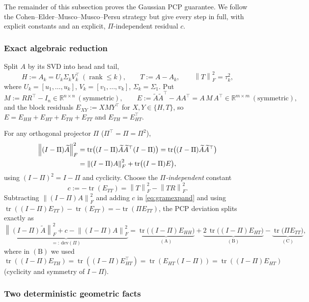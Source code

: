\documentclass{amsart}
\theoremstyle{definition}
\DeclareMathOperator{\rank}{rank}
\DeclareMathOperator{\tr}{tr}
\newcommand{\R}{\mathbb{R}}
\newcommand{\Frob}[1]{\left\lVert #1\right\rVert_F}
\newcommand{\Atil}{\widetilde{A}}
\begin{document}
The remainder of this subsection proves the Gaussian PCP guarantee. We follow
the Cohen--Elder--Musco--Musco--Persu strategy but give every step in full, with
explicit constants and an explicit, $\Pi$-independent residual $c$.

\subsubsection*{Exact algebraic reduction}

Split $A$ by its SVD into head and tail,
\[
H:=A_k=U_k\Sigma_k V_k^\top\ (\rank\le k),\qquad T:=A-A_k,\qquad \Frob{T}^2=\tau_k^2,
\]
where $U_k=[u_1,\dots,u_k]$, $V_k=[v_1,\dots,v_k]$, $\Sigma_k=\Sigma_1$. Put
\[
M:=RR^\top-I_n\in\R^{n\times n}\ (\text{symmetric}),\qquad
E:=\Atil\Atil^\top-AA^\top=A\,M\,A^\top\in\R^{m\times m}\ (\text{symmetric}),
\]
and the block residuals
$E_{XY}:=X M Y^\top$ for $X,Y\in\{H,T\}$, so $E=E_{HH}+E_{HT}+E_{TH}+E_{TT}$ and
$E_{TH}=E_{HT}^\top$.

For any orthogonal projector $\Pi$ ($\Pi^\top=\Pi=\Pi^2$),
\begin{align}
\Frob{(I-\Pi)\Atil}^2
&=\tr\!\big((I-\Pi)\Atil\Atil^\top(I-\Pi)\big)
=\tr\!\big((I-\Pi)\Atil\Atil^\top\big)\notag\\
&=\Frob{(I-\Pi)A}^2+\tr\!\big((I-\Pi)E\big),\label{eq:gramexpand}
\end{align}
using $(I-\Pi)^2=I-\Pi$ and cyclicity. Choose the \emph{$\Pi$-independent}
constant
\begin{equation}\label{eq:cdef}
c:=-\tr(E_{TT})=\Frob{T}^2-\Frob{TR}^2 .
\end{equation}
Subtracting $\Frob{(I-\Pi)A}^2$ and adding $c$ in \eqref{eq:gramexpand} and using
$\tr((I-\Pi)E_{TT})-\tr(E_{TT})=-\tr(\Pi E_{TT})$, the PCP deviation splits
exactly as
\begin{equation}\label{eq:devsplit}
\underbrace{\Frob{(I-\Pi)\Atil}^2+c-\Frob{(I-\Pi)A}^2}_{=:\ \mathrm{dev}(\Pi)}
=\underbrace{\tr\!\big((I-\Pi)E_{HH}\big)}_{(\mathrm A)}
+\underbrace{2\,\tr\!\big((I-\Pi)E_{HT}\big)}_{(\mathrm B)}
-\underbrace{\tr\!\big(\Pi E_{TT}\big)}_{(\mathrm C)} ,
\end{equation}
where in $(\mathrm B)$ we used $\tr((I-\Pi)E_{TH})=\tr((I-\Pi)E_{HT}^\top)
=\tr(E_{HT}(I-\Pi))=\tr((I-\Pi)E_{HT})$ (cyclicity and symmetry of $I-\Pi$).

\subsubsection*{Two deterministic geometric facts}
\end{document}
